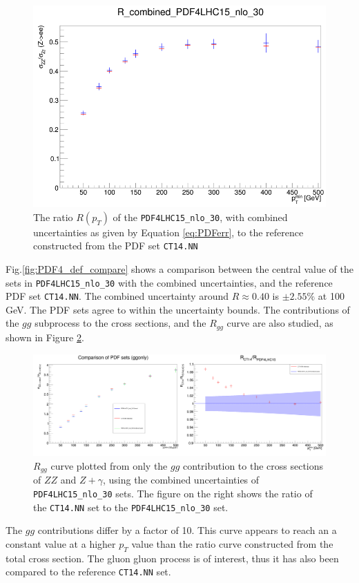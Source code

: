\documentclass[11pt,a4paper,final]{report}
\begin{document}
\begin{figure}[H]
\centering
	\includegraphics[width = 0.6\linewidth]{PDF4_CT14_comp.png}
	\caption{The ratio $R(p_T)$ of the \texttt{PDF4LHC15\_nlo\_30}, with combined uncertainties as given by Equation \ref{eq:PDFerr}, to the reference constructed from the PDF set \texttt{CT14.NN}}
	\label{fig:PDF4_def_compare}
	\label{pdfcompare}
\end{figure}
\noindent Fig.\ref{fig:PDF4_def_compare} shows a comparison between the central value of the sets in \texttt{PDF4LHC15\_nlo\_30} with the combined uncertainties, and the reference PDF set \texttt{CT14.NN}. The combined uncertainty around $R \approx 0.40$ is $\pm 2.55\%$ at 100 GeV. The PDF sets agree to within the uncertainty bounds. The contributions of the $gg$ subprocess to the cross sections, and the $R_{gg}$ curve are also studied, as shown in Figure \ref{pdfcompare_gg}.
\begin{figure}[H]
\centering
	\includegraphics[width=\textwidth]{gg_PDF4.png}
	\caption{$R_{gg}$ curve plotted from only the $gg$ contribution to the cross sections of $ZZ$ and $Z+\gamma$, using the combined uncertainties of \texttt{PDF4LHC15\_nlo\_30} sets. The figure on the right shows the ratio of the \texttt{CT14.NN} set to the \texttt{PDF4LHC15\_nlo\_30} set.}
	\label{pdfcompare_gg}
\end{figure}
The $gg$ contributions differ by a factor of 10. This curve appears to reach an a constant value at a higher $p_T$ value than the ratio curve constructed from the total cross section. The gluon gluon process is of interest, thus it has also been compared to the reference \texttt{CT14.NN} set.
\end{document}
